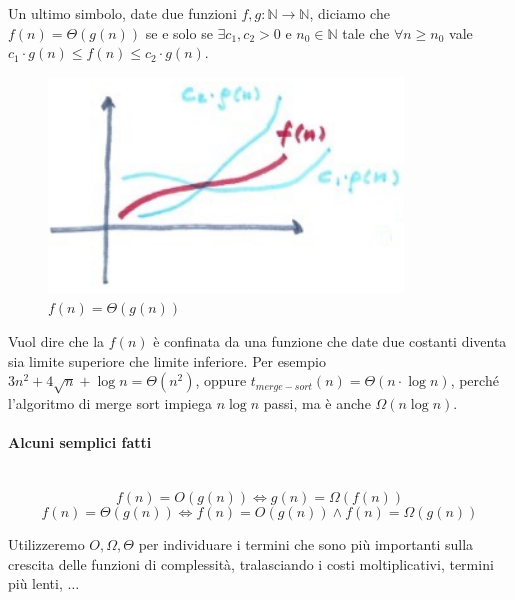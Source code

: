 \documentclass{article}
\begin{document}
Un ultimo simbolo, date due funzioni $f,g:\mathbb{N}\rightarrow\mathbb{N}$, diciamo che
$f(n)=\Theta(g(n))$ se e solo se $\exists c_1,c_2 >0$ e $n_0\in\mathbb{N}$ tale che
$\forall n\geq n_0$ vale $c_1\cdot g(n)\leq f(n)\leq c_2\cdot g(n)$.
\begin{figure}[H]
    \centering
    \includegraphics[scale=0.5]{images/theta.png}
    \caption{$f(n)=\Theta(g(n))$}
\end{figure}

Vuol dire che la $f(n)$ è confinata da una funzione che date due costanti diventa sia
limite superiore che limite inferiore. Per esempio $3n^2+4\sqrt{n}+\log n=\Theta(n^2)$,
oppure $t_{merge-sort}(n)=\Theta(n\cdot\log n)$, perché l'algoritmo di merge sort
impiega $n\log n$ passi, ma è anche $\Omega(n\log n)$.

\paragraph{Alcuni semplici fatti}\mbox{}\\
$$f(n)=O(g(n))\Leftrightarrow g(n)=\Omega(f(n))$$
$$f(n)=\Theta(g(n))\Leftrightarrow f(n)=O(g(n))\land f(n)=\Omega(g(n))$$

Utilizzeremo $O,\Omega,\Theta$ per individuare i termini che sono più importanti sulla crescita
delle funzioni di complessità, tralasciando i costi moltiplicativi, termini più lenti, $\dots$
\end{document}
